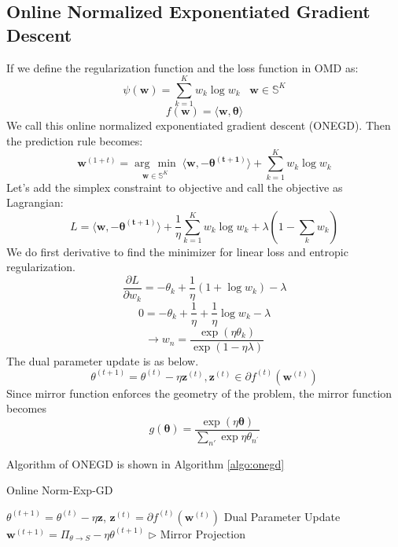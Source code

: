 \documentclass[11pt]{article}
\DeclareMathOperator*{\minimize}{min}
\DeclareMathOperator*{\maximize}{max}
\newcommand{\argmin}[1]{\underset{#1}{\operatorname{arg}\,\operatorname{min}}\;}
\begin{document}




\subsection{Online Normalized Exponentiated Gradient Descent}
If we define the regularization function and the loss function in OMD as:
$$
\psi(\bm{w}) = \sum_{k=1}^K  w_k \log w_k \;\;\; \bm{w} \in \mathbb{S}^K
$$
$$
f(\bm{w}) = \big\langle\bm{w}, \bm{\theta}\big\rangle
$$
We call this online normalized exponentiated gradient descent (ONEGD). Then the prediction rule becomes:
$$
\bm{w}^{(1+t)} = \argmin{\bm{w}\in\mathbb{S}^K} \big\langle \bm{w}, -\bm{\theta^{(t+1)}} \big\rangle + \sum_{k=1}^K w_k \log w_k
$$
Let's add the simplex constraint to objective and call the objective as Lagrangian:
$$
L = \big\langle \bm{w}, -\bm{\theta^{(t+1)}} \big\rangle + \frac{1}{\eta}\sum_{k=1}^K w_k \log w_k + \lambda(1-\sum_k w_k) 
$$
We do first derivative to find the minimizer for linear loss and entropic regularization.
$$
\frac{\partial L}{\partial w_k} = -\theta_k + \frac{1}{\eta} (1+\log w_k) - \lambda
$$
$$
0 = -\theta_k + \frac{1}{\eta} + \frac{1}{\eta}\log w_k - \lambda
$$
$$
\rightarrow w_n = \frac{\exp(\eta\theta_k)}{\exp(1-\eta\lambda)}
$$
The dual parameter update is as below.
$$
\theta^{(t+1)} = \theta^{(t)} - \eta\bm{z}^{(t)}, \bm{z}^{(t)} \in \partial f^{(t)}(\bm{w}^{(t)})
$$
Since mirror function enforces the geometry of the problem, the mirror function becomes
$$
g(\bm{\theta}) = \frac{\exp(\eta\bm{\theta})}{\sum_{n'}\exp \eta\theta_{n^'}}
$$



Algorithm of ONEGD is shown in Algorithm \ref{algo:onegd}
\begin{algorithm}[H]
\caption{Online Norm-Exp-GD}
\label{algo:onegd}
\begin{algorithmic}[1]
\STATE $\theta^{(t+1)} = \theta^{(t)} - \eta \textbf{z}$, $ \textbf{z}^{(t)} = \partial f^{(t)}(\textbf{w}^{(t)})$ \hfill Dual Parameter Update
\STATE $\textbf{w}^{(t+1)} = \Pi_{\theta \rightarrow S}-\eta \theta^{(t+1)}$ \hfill $\triangleright$ Mirror Projection
\ENDFOR
\end{algorithmic}
\end{algorithm}
\end{document}
